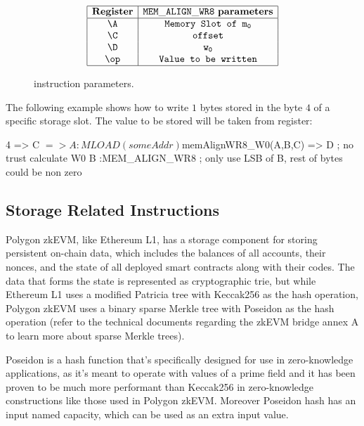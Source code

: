 \begin{figure}[h!]
    \renewcommand{\figurename}{Table}
    \[
    \begin{array}{|c|c|}
        \hline
        \mathbf{Register} &\mathtt{MEM\_ALIGN\_WR8} \ \textbf{parameters} \\ \hline
        \A & \texttt{Memory Slot of } \mathtt{m_0} \\
        \C & \mathtt{offset} \\
        \D & \mathtt{w_0} \\
        \op& \texttt{Value to be written} \\
        \hline
    \end{array}
    \]
    \caption{\MEMALIGNWRE instruction parameters.}
    \label{tab:memory-first-example}
\end{figure}

The following example shows how to write $1$ bytes stored in the byte $4$ of a specific storage slot. The value to be stored will be taken from \B register:

\begin{zkasm}
4 => C
$ => A          :MLOAD(someAddr)
${memAlignWR8_W0(A,B,C)} => D  ; no trust calculate W0
B               :MEM_ALIGN_WR8 ; only use LSB of B, rest of bytes could be non zero
\end{zkasm}

\subsection{Storage Related Instructions}

Polygon zkEVM, like Ethereum L1, has a storage component for storing persistent on-chain data, which includes the balances of all accounts, their nonces, and the state of all deployed smart contracts along with their codes. The data that forms the state is represented as cryptographic trie, but while Ethereum L1 uses a modified Patricia tree with Keccak256 as the hash operation, Polygon zkEVM uses a binary sparse Merkle tree with Poseidon as the hash operation (refer to the technical documents regarding the zkEVM bridge annex A to learn more about sparse Merkle trees).

Poseidon is a hash function that's specifically designed for use in zero-knowledge applications, as it's meant to operate with values of a prime field and it has been proven to be much more performant than Keccak256 in zero-knowledge constructions like those used in Polygon zkEVM. Moreover Poseidon hash has an input named capacity, which can be used as an extra input value.


